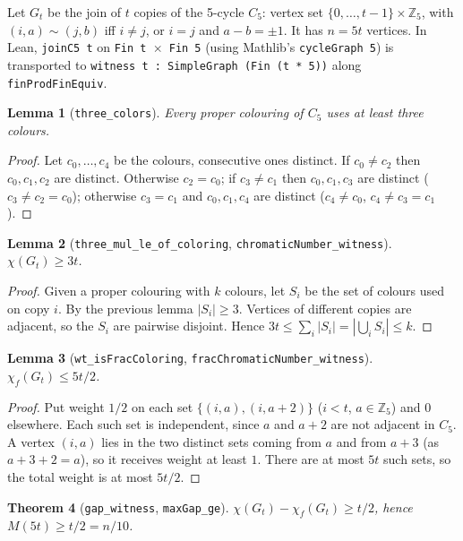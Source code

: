 \documentclass[11pt]{article}
\newtheorem{theorem}{Theorem}
\newtheorem{lemma}[theorem]{Lemma}
\theoremstyle{definition}
\theoremstyle{remark}
\begin{document}
Let $G_t$ be the join of $t$ copies of the 5-cycle $C_5$: vertex set $\{0,\dots,t-1\}\times\mathbb{Z}_5$,
with $(i,a)\sim(j,b)$ iff $i\ne j$, or $i=j$ and $a-b=\pm1$. It has $n=5t$ vertices. In Lean,
\texttt{joinC5 t} on \texttt{Fin t $\times$ Fin 5} (using Mathlib's \texttt{cycleGraph 5}) is
transported to \texttt{witness t : SimpleGraph (Fin (t * 5))} along \texttt{finProdFinEquiv}.

\begin{lemma}[\texttt{three\_colors}]
Every proper colouring of $C_5$ uses at least three colours.
\end{lemma}
\begin{proof}
Let $c_0,\dots,c_4$ be the colours, consecutive ones distinct. If $c_0\ne c_2$ then $c_0,c_1,c_2$ are
distinct. Otherwise $c_2=c_0$; if $c_3\ne c_1$ then $c_0,c_1,c_3$ are distinct ($c_3\ne c_2=c_0$);
otherwise $c_3=c_1$ and $c_0,c_1,c_4$ are distinct ($c_4\ne c_0$, $c_4\ne c_3=c_1$).
\end{proof}

\begin{lemma}[\texttt{three\_mul\_le\_of\_coloring}, \texttt{chromaticNumber\_witness}]
$\chi(G_t)\ge 3t$.
\end{lemma}
\begin{proof}
Given a proper colouring with $k$ colours, let $S_i$ be the set of colours used on copy $i$. By the
previous lemma $|S_i|\ge 3$. Vertices of different copies are adjacent, so the $S_i$ are pairwise
disjoint. Hence $3t\le\sum_i|S_i|=|\bigcup_i S_i|\le k$.
\end{proof}

\begin{lemma}[\texttt{wt\_isFracColoring}, \texttt{fracChromaticNumber\_witness}]
$\chi_f(G_t)\le 5t/2$.
\end{lemma}
\begin{proof}
Put weight $1/2$ on each set $\{(i,a),(i,a+2)\}$ ($i<t$, $a\in\mathbb{Z}_5$) and $0$ elsewhere. Each
such set is independent, since $a$ and $a+2$ are not adjacent in $C_5$. A vertex $(i,a)$ lies in the
two distinct sets coming from $a$ and from $a+3$ (as $a+3+2=a$), so it receives weight at least $1$.
There are at most $5t$ such sets, so the total weight is at most $5t/2$.
\end{proof}

\begin{theorem}[\texttt{gap\_witness}, \texttt{maxGap\_ge}]
$\chi(G_t)-\chi_f(G_t)\ge t/2$, hence $M(5t)\ge t/2=n/10$.
\end{theorem}
\end{document}
